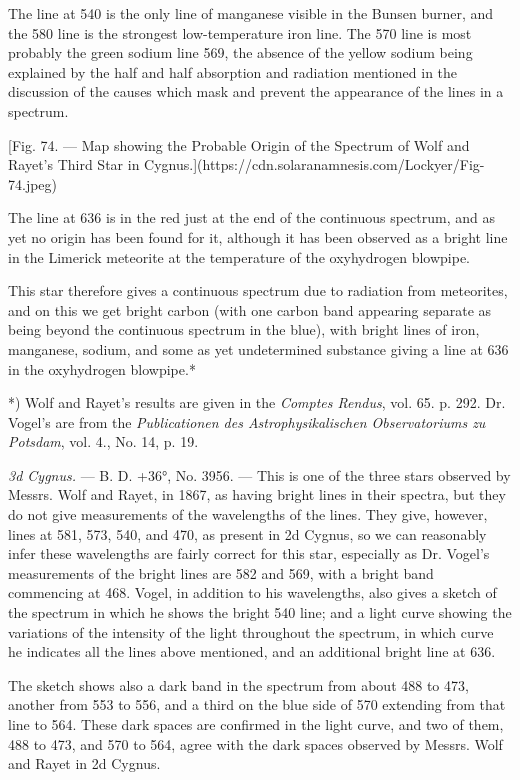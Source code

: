 \documentclass[a4paper, 12pt, oneside, polutonikogreek, english]{article}
\begin{document}
The line at 540 is the only line of manganese visible in the Bunsen burner, and the 580 line is the strongest low-temperature iron line. The 570 line is most probably the green sodium line 569, the absence of the yellow sodium being explained by the half and half absorption and radiation mentioned in the discussion of the causes which mask and prevent the appearance of the lines in a spectrum.

[Fig. 74. --- Map showing the Probable Origin of the Spectrum of Wolf and Rayet's Third Star in Cygnus.](https://cdn.solaranamnesis.com/Lockyer/Fig-74.jpeg)

The line at 636 is in the red just at the end of the continuous spectrum, and as yet no origin has been found for it, although it has been observed as a bright line in the Limerick meteorite at the temperature of the oxyhydrogen blowpipe.

This star therefore gives a continuous spectrum due to radiation from meteorites, and on this we get bright carbon (with one carbon band appearing separate as being beyond the continuous spectrum in the blue), with bright lines of iron, manganese, sodium, and some as yet undetermined substance giving a line at 636 in the oxyhydrogen blowpipe.*

*) Wolf and Rayet's results are given in the \emph{Comptes Rendus}, vol. 65. p. 292. Dr. Vogel's are from the \emph{Publicationen des Astrophysikalischen Observatoriums zu Potsdam}, vol. 4., No. 14, p. 19.

\emph{3d Cygnus.} --- B. D. +36°, No. 3956. --- This is one of the three stars observed by Messrs. Wolf and Rayet, in 1867, as having bright lines in their spectra, but they do not give measurements of the wavelengths of the lines. They give, however, lines at 581, 573, 540, and 470, as present in 2d Cygnus, so we can reasonably infer these wavelengths are fairly correct for this star, especially as Dr. Vogel's measurements of the bright lines are 582 and 569, with a bright band commencing at 468. Vogel, in addition to his wavelengths, also gives a sketch of the spectrum in which he shows the bright 540 line; and a light curve showing the variations of the intensity of the light throughout the spectrum, in which curve he indicates all the lines above mentioned, and an additional bright line at 636.

The sketch shows also a dark band in the spectrum from about 488 to 473, another from 553 to 556, and a third on the blue side of 570 extending from that line to 564. These dark spaces are confirmed in the light curve, and two of them, 488 to 473, and 570 to 564, agree with the dark spaces observed by Messrs. Wolf and Rayet in 2d Cygnus.
\end{document}
